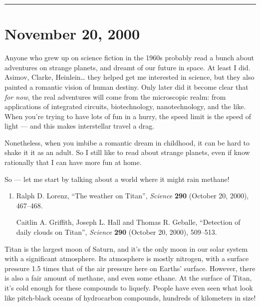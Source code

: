 \documentclass{article}
\begin{document}
\begin{center}\rule{0.5\linewidth}{0.5pt}\end{center}



\hypertarget{week160}{%
\section{November 20, 2000}\label{week160}}

Anyone who grew up on science fiction in the 1960s probably read a bunch
about adventures on strange planets, and dreamt of our future in space.
At least I did. Asimov, Clarke, Heinlein\ldots{} they helped get me
interested in science, but they also painted a romantic vision of human
destiny. Only later did it become clear that \emph{for now}, the real
adventures will come from the microscopic realm: from applications of
integrated circuits, biotechnology, nanotechnology, and the like. When
you're trying to have lots of fun in a hurry, the speed limit is the
speed of light --- and this makes interstellar travel a drag.

Nonetheless, when you imbibe a romantic dream in childhood, it can be
hard to shake it it as an adult. So I still like to read about strange
planets, even if know rationally that I can have more fun at home.

So --- let me start by talking about a world where it might rain
methane!

\begin{enumerate}
\def\labelenumi{\arabic{enumi})}
\item
  Ralph D. Lorenz, ``The weather on Titan'', \emph{Science} \textbf{290}
  (October 20, 2000), 467--468.

  Caitlin A. Griffith, Joseph L. Hall and Thomas R. Geballe, ``Detection
  of daily clouds on Titan'', \emph{Science} \textbf{290} (October 20,
  2000), 509--513.
\end{enumerate}

Titan is the largest moon of Saturn, and it's the only moon in our solar
system with a significant atmosphere. Its atmosphere is mostly nitrogen,
with a surface pressure 1.5 times that of the air pressure here on
Earths' surface. However, there is also a fair amount of methane, and
even some ethane. At the surface of Titan, it's cold enough for these
compounds to liquefy. People have even seen what look like pitch-black
oceans of hydrocarbon compounds, hundreds of kilometers in size!
\end{document}
